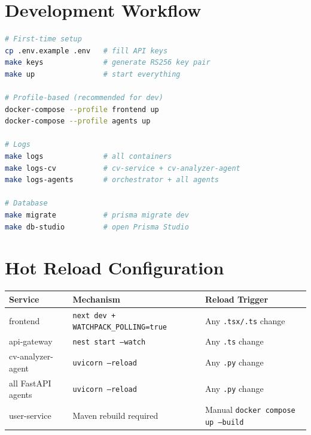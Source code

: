 \documentclass[12pt, a4paper]{report}
\begin{document}
\section{Development Workflow}

\begin{tcolorbox}[colback=dark!5, colframe=dark!30, arc=5pt,
  title={\faTerminal\quad Common Commands}, fonttitle=\bfseries]
\begin{lstlisting}[language=bash, numbers=none, frame=none, backgroundcolor=\color{white}]
# First-time setup
cp .env.example .env   # fill API keys
make keys              # generate RS256 key pair
make up                # start everything

# Profile-based (recommended for dev)
docker-compose --profile frontend up
docker-compose --profile agents up

# Logs
make logs              # all containers
make logs-cv           # cv-service + cv-analyzer-agent
make logs-agents       # orchestrator + all agents

# Database
make migrate           # prisma migrate dev
make db-studio         # open Prisma Studio
\end{lstlisting}
\end{tcolorbox}

\section{Hot Reload Configuration}

\begin{center}
\begin{tabular}{lll}
\toprule
\rowcolor{primary!20}
\textbf{Service} & \textbf{Mechanism} & \textbf{Reload Trigger} \\
\midrule
frontend & \texttt{next dev + WATCHPACK\_POLLING=true} & Any \texttt{.tsx/.ts} change \\
api-gateway & \texttt{nest start --watch} & Any \texttt{.ts} change \\
cv-analyzer-agent & \texttt{uvicorn --reload} & Any \texttt{.py} change \\
all FastAPI agents & \texttt{uvicorn --reload} & Any \texttt{.py} change \\
user-service & Maven rebuild required & Manual \texttt{docker compose up --build} \\
\bottomrule
\end{tabular}
\end{center}
\end{document}
